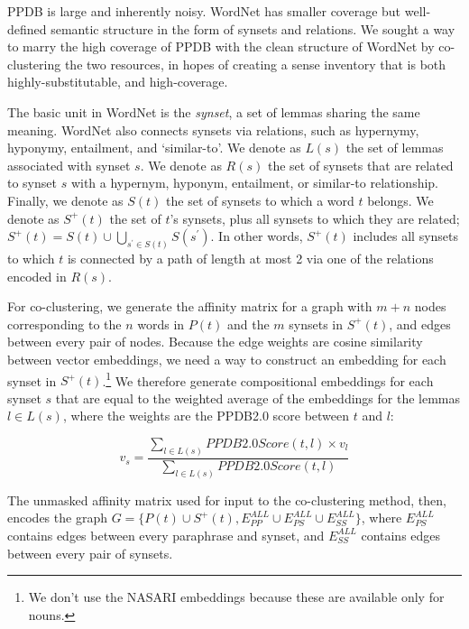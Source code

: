 \documentclass[11pt]{article}
\begin{document}
PPDB is large and inherently noisy. WordNet %
has smaller coverage but well-defined semantic structure in the form of synsets and relations. We sought a way to marry the high coverage of PPDB with the clean structure of WordNet by co-clustering the two resources, in hopes of creating a sense inventory that is both highly-substitutable, and high-coverage. %

The basic unit in WordNet is the \textit{synset}, a set of lemmas sharing the same meaning. WordNet also connects synsets via relations, such as hypernymy, hyponymy, entailment, and `similar-to'. We denote as $L(s)$ the set of lemmas associated with synset $s$. We denote as $R(s)$ the set of synsets that are related to synset $s$ with a hypernym, hyponym, entailment, or similar-to relationship. Finally, we denote as $S(t)$ the set of synsets to which a word $t$ belongs. We denote as $S^+(t)$ the set of $t$'s synsets, plus all synsets to which they are related; $S^+(t) = S(t) \cup \bigcup_{s^\prime \in S(t)} S(s^\prime)$. In other words, $S^+(t)$ includes all synsets to which $t$ is connected by a path of length at most 2 via one of the relations encoded in $R(s)$.

For co-clustering, we generate the affinity matrix for a graph with $m+n$ nodes corresponding to the $n$ words in $P(t)$ and the $m$ synsets in $S^+(t)$, and edges between every pair of nodes. Because the edge weights are cosine similarity between vector embeddings, we need a way to construct an embedding for each synset in $S^+(t)$.\footnote{We don't use the NASARI embeddings \cite{camachocollados-pilehvar-navigli:2015:NAACL-HLT} because these are available only for nouns.} We therefore generate compositional embeddings for each synset $s$ that are equal to the weighted average of the embeddings for the lemmas $l \in L(s)$, where the weights are the PPDB2.0 score between $t$ and $l$:

\[v_s = \frac{\sum_{l \in L(s)} PPDB2.0Score(t, l) \times v_l}{\sum_{l \in L(s)} PPDB2.0Score(t, l)}\]

\noindent The unmasked affinity matrix used for input to the co-clustering method, then, encodes the graph $G = \{P(t) \cup S^+(t), E_{PP}^{ALL} \cup E_{PS}^{ALL} \cup E_{SS}^{ALL} \}$, where $E_{PS}^{ALL}$ contains edges between every paraphrase and synset, and $E_{SS}^{ALL}$ contains edges between every pair of synsets.
\end{document}
